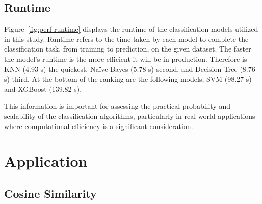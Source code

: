 \break

\subsection{Runtime}


Figure~\ref{fig:perf-runtime} displays the runtime of the classification models utilized in this study. Runtime refers to the time taken by each model to complete the classification task, from training to prediction, on the given dataset. The faster the model’s runtime is the more efficient it will be in production. Therefore is KNN (4.93 s) the quickest, Naïve Bayes (5.78 s) second, and Decision Tree (8.76 s) third. At the bottom of the ranking are the following models, SVM (98.27 s) and XGBoost (139.82 s).

This information is important for assessing the practical probability and scalability of the classification algorithms, particularly in real-world applications where computational efficiency is a significant consideration.

\section{Application}

\subsection{Cosine Similarity}